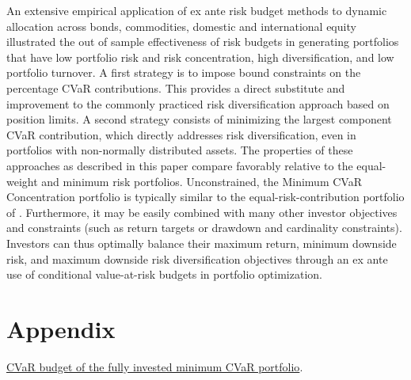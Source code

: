 \documentclass[12pt,a4paper]{article}
\begin{document}
An extensive empirical application of ex ante risk budget methods to dynamic allocation across bonds, commodities, domestic and international equity illustrated the out of sample effectiveness of risk budgets in generating portfolios that have low portfolio risk and risk concentration, high diversification, and low portfolio turnover. A first strategy is to impose bound constraints on the percentage CVaR contributions. This provides a direct substitute and improvement to the commonly practiced risk diversification approach based on position limits. A second strategy consists of minimizing the largest component CVaR contribution, which directly addresses risk diversification, even in portfolios with non-normally distributed assets. The properties of these approaches as described in this paper compare favorably relative to the equal-weight and minimum risk portfolios. Unconstrained, the Minimum CVaR Concentration  portfolio is typically similar to the equal-risk-contribution portfolio of \citet{Qian2005}. Furthermore, it may be easily combined with many other investor objectives and constraints (such as return targets or drawdown and cardinality constraints). Investors can thus optimally balance their maximum return, minimum downside risk, and maximum downside risk diversification objectives through an ex ante use of conditional value-at-risk  budgets in portfolio optimization.

\newpage

\section{Appendix \label{sec:Appendix}}

\noindent \underline{CVaR budget of the fully invested minimum CVaR portfolio}.
\end{document}
